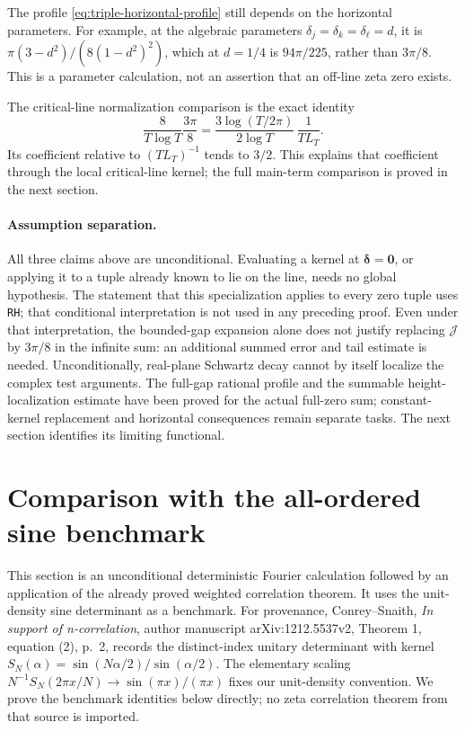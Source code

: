 \documentclass[11pt]{article}
\begin{document}
The profile \eqref{eq:triple-horizontal-profile} still depends on the
horizontal parameters. For example, at the algebraic parameters
\(\delta_j=\delta_k=\delta_\ell=d\), it is
\(\pi(3-d^2)/(8(1-d^2)^2)\), which at \(d=1/4\) is
\(94\pi/225\), rather than \(3\pi/8\). This is a parameter calculation,
not an assertion that an off-line zeta zero exists.

The critical-line normalization comparison is the exact identity
\begin{equation}\label{eq:triple-critical-normalization}
 \frac8{T\log T}\frac{3\pi}{8}
 =\frac{3\log(T/2\pi)}{2\log T}\,\frac1{TL_T}.
\end{equation}
Its coefficient relative to \((TL_T)^{-1}\) tends to \(3/2\).
This explains that coefficient through the local critical-line kernel;
the full main-term comparison is proved in the next section.

\paragraph{Assumption separation.}
All three claims above are unconditional. Evaluating a kernel at
\(\boldsymbol\delta=\mathbf0\), or applying it to a tuple already known
to lie on the line, needs no global hypothesis. The statement that this
specialization applies to every zero tuple uses \texttt{RH}; that
conditional interpretation is not used in any preceding proof.
Even under that interpretation, the bounded-gap expansion alone does
not justify replacing \(\mathcal J\) by \(3\pi/8\) in the infinite
sum: an additional summed error and tail estimate is needed.
Unconditionally, real-plane Schwartz decay cannot by itself localize
the complex test arguments. The full-gap rational profile and the
summable height-localization estimate have been proved for the actual
full-zero sum; constant-kernel replacement and horizontal consequences
remain separate tasks. The next section identifies its limiting functional.

\section{Comparison with the all-ordered sine benchmark}

This section is an unconditional deterministic Fourier calculation followed
by an application of the already proved weighted correlation theorem.
It uses the unit-density sine determinant as a benchmark. For provenance,
Conrey--Snaith, \emph{In support of n-correlation}, author manuscript
arXiv:1212.5537v2, Theorem 1, equation (2), p.~2, records the distinct-index
unitary determinant with kernel
\(S_N(\alpha)=\sin(N\alpha/2)/\sin(\alpha/2)\).
The elementary scaling
\(N^{-1}S_N(2\pi x/N)\to\sin(\pi x)/(\pi x)\)
fixes our unit-density convention. We prove the benchmark identities
below directly; no zeta correlation theorem from that source is imported.
\end{document}
